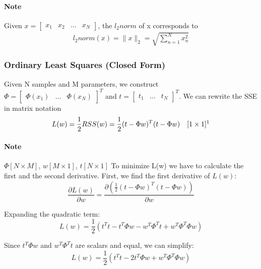 \documentclass[../main.tex]{subfiles}
\begin{document}
\paragraph{Note} Given $x=\begin{bmatrix}x_1 & x_2 & \dots & x_{N}\end{bmatrix}$, the $l_2 norm$ of x corresponds to
\begin{align}
    l_2norm(x) = \|x\|_{2} = \sqrt{\sum_{n=1}^{N} x_n^2}
\end{align}

\newpage
\subsubsection{Ordinary Least Squares (Closed Form)}
Given N samples and M parameters, we construct $\Phi=\begin{bmatrix}\Phi(x_1) & \dots & \Phi(x_N)\end{bmatrix}^T$ and $t=\begin{bmatrix}t_1 & \dots & t_N\end{bmatrix}^T$.
\newline
We can rewrite the SSE in matrix notation
\begin{equation}
    L(w) = \frac{1}{2}RSS(w)=\frac{1}{2}(t-\Phi w)^T(t-\Phi w) \quad [1 \times 1]\footnotemark
\end{equation}

\paragraph{Note} $\Phi[N \times M]$, $w[M \times 1]$, $t[N \times 1]$
\newline
To minimize L(w) we have to calculate the first and the second derivative.
First, we find the first derivative of \(L(w)\):
\begin{equation}
    \frac{\partial L(w)}{\partial w}=\frac{\partial\left(\frac{1}{2}(t-\Phi w)^T(t-\Phi w)\right)}{\partial w}
\end{equation}

Expanding the quadratic term:
\begin{equation}
    L(w) = \frac{1}{2} \left( t^T t - t^T \Phi w - w^T \Phi^T t + w^T \Phi^T \Phi w \right)
\end{equation}

Since \(t^T \Phi w\) and \(w^T \Phi^T t\) are scalars and equal, we can simplify:
\begin{equation}
    L(w) = \frac{1}{2} \left( t^T t - 2t^T \Phi w + w^T \Phi^T \Phi w \right)
\end{equation}
\end{document}
